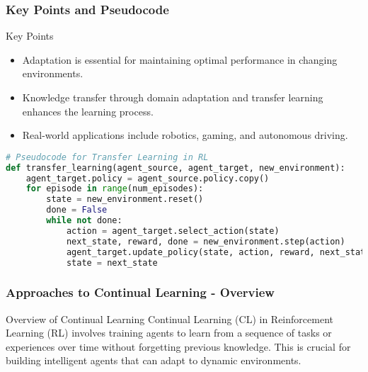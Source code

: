 \documentclass[aspectratio=169]{beamer}
\begin{document}
\begin{frame}[fragile]
    \frametitle{Key Points and Pseudocode}
    \begin{block}{Key Points}
        \begin{itemize}
            \item Adaptation is essential for maintaining optimal performance in changing environments.
            \item Knowledge transfer through domain adaptation and transfer learning enhances the learning process.
            \item Real-world applications include robotics, gaming, and autonomous driving.
        \end{itemize}
    \end{block}
    
    \begin{lstlisting}[language=Python]
# Pseudocode for Transfer Learning in RL
def transfer_learning(agent_source, agent_target, new_environment):
    agent_target.policy = agent_source.policy.copy()
    for episode in range(num_episodes):
        state = new_environment.reset()
        done = False
        while not done:
            action = agent_target.select_action(state)
            next_state, reward, done = new_environment.step(action)
            agent_target.update_policy(state, action, reward, next_state)
            state = next_state
    \end{lstlisting}
\end{frame}

\begin{frame}[fragile]
    \frametitle{Approaches to Continual Learning - Overview}
    \begin{block}{Overview of Continual Learning}
        Continual Learning (CL) in Reinforcement Learning (RL) involves training agents to learn from a sequence of tasks or experiences over time without forgetting previous knowledge. This is crucial for building intelligent agents that can adapt to dynamic environments.
    \end{block}
\end{frame}
\end{document}
